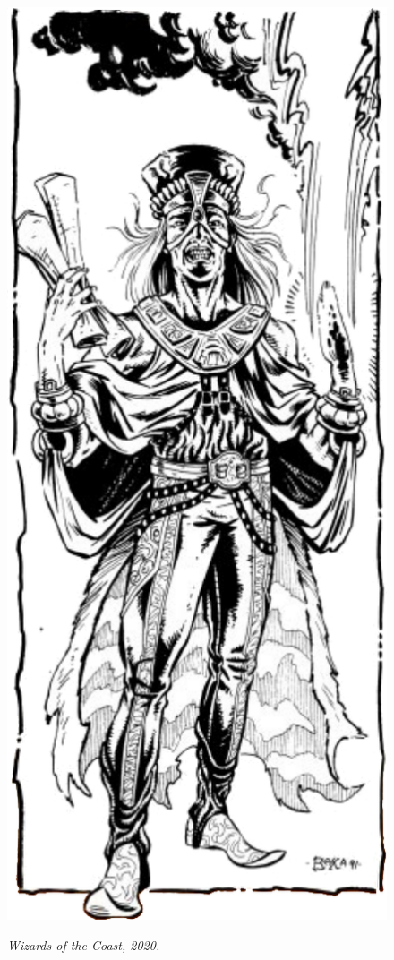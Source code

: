 \begin{figure}[t!]
\centering
\includegraphics[width=\columnwidth]{images/templar-1.png}
\par\textit{\small\textcopyright Wizards of the Coast, 2020.}
\end{figure}

